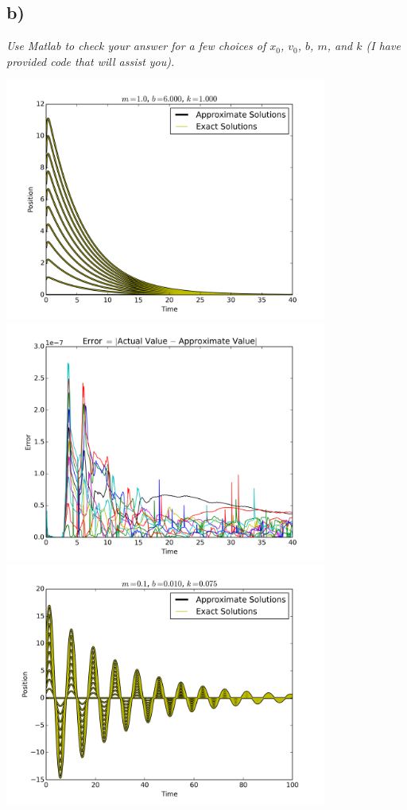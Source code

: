 \documentclass[12pt]{article}
\begin{document}
\subsection*{ b)}
{\it Use Matlab to check your answer for a few choices of $x_0$, $v_0$, $b$, $m$, and $k$ (I have provided code that will assist you).}

\begin{center}
	\includegraphics[width=400px]{figures/2_b_decay_1.png}
	\includegraphics[width=400px]{figures/2_b_decay_2.png}
	\includegraphics[width=400px]{figures/2_b_oscillation_1.png}

\end{center}
\end{document}
